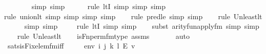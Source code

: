 \begin{isabellebody}
\ \ \ \ \ \ \isamarkupfalse%
\ {\isacharparenleft}{\kern0pt}simp{\isacharcomma}{\kern0pt}\ simp{\isacharparenright}{\kern0pt}\isanewline
\ \ \ \ \ \isamarkupfalse%
{\isacharparenleft}{\kern0pt}rule\ ltI{\isacharcomma}{\kern0pt}\ simp{\isacharcomma}{\kern0pt}\ simp{\isacharcomma}{\kern0pt}\ simp{\isacharparenright}{\kern0pt}\isanewline
\ \ \isamarkupfalse%
{\isacharparenleft}{\kern0pt}rule\ union{\isacharunderscore}{\kern0pt}lt{}{\isacharcomma}{\kern0pt}\ simp{\isacharcomma}{\kern0pt}\ simp{\isacharcomma}{\kern0pt}\ simp{\isacharcomma}{\kern0pt}\ simp{\isacharparenright}{\kern0pt}\isanewline
\ \ \ \isamarkupfalse%
{\isacharparenleft}{\kern0pt}rule\ pred{\isacharunderscore}{\kern0pt}le{\isacharcomma}{\kern0pt}\ simp{\isacharcomma}{\kern0pt}\ simp{\isacharparenright}{\kern0pt}\isanewline
\ \ \ \isamarkupfalse%
{\isacharparenleft}{\kern0pt}rule\ Un{\isacharunderscore}{\kern0pt}least{\isacharunderscore}{\kern0pt}lt{\isacharparenright}{\kern0pt}{\isacharplus}{\kern0pt}\isanewline
\ \ \ \ \ \isamarkupfalse%
{\isacharparenleft}{\kern0pt}simp{\isacharcomma}{\kern0pt}\ simp{\isacharparenright}{\kern0pt}\isanewline
\ \ \ \ \isamarkupfalse%
{\isacharparenleft}{\kern0pt}rule\ ltI{\isacharcomma}{\kern0pt}\ simp{\isacharcomma}{\kern0pt}\ simp{\isacharparenright}{\kern0pt}\isanewline
\ \ \ \isamarkupfalse%
{\isacharparenleft}{\kern0pt}subst\ arity{\isacharunderscore}{\kern0pt}fun{\isacharunderscore}{\kern0pt}apply{\isacharunderscore}{\kern0pt}fm{\isacharcomma}{\kern0pt}\ simp{\isacharcomma}{\kern0pt}\ simp{\isacharparenright}{\kern0pt}\isanewline
\ \ \ \isamarkupfalse%
{\isacharparenleft}{\kern0pt}rule\ Un{\isacharunderscore}{\kern0pt}least{\isacharunderscore}{\kern0pt}lt{\isacharparenright}{\kern0pt}{\isacharplus}{\kern0pt}\isanewline
\ \ \isamarkupfalse%
\ is{\isacharunderscore}{\kern0pt}Fn{\isacharunderscore}{\kern0pt}perm{\isacharprime}{\kern0pt}{\isacharunderscore}{\kern0pt}fm{\isacharunderscore}{\kern0pt}type\ assms\isanewline
\ \ \ \ \ \isamarkupfalse%
\ auto\isanewline
\ \ \isamarkupfalse%
%
\endisatagproof
{\isafoldproof}%
%
\isadelimproof
\isanewline
%
\endisadelimproof
\isanewline
{}\isamarkupfalse%
\ sats{\isacharunderscore}{\kern0pt}is{\isacharunderscore}{\kern0pt}Fix{\isacharunderscore}{\kern0pt}elem{\isacharunderscore}{\kern0pt}fm{\isacharunderscore}{\kern0pt}iff\ {\isacharcolon}{\kern0pt}\ \isanewline
\ \ \ env\ i\ j\ k\ l\ E\ v\ \isanewline

\end{isabellebody}
